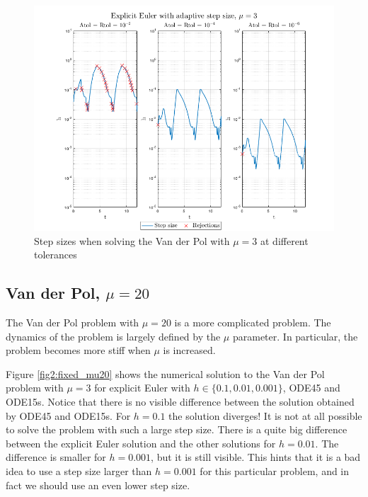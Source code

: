 \begin{figure}[H]
    \centering
    \includegraphics[width=\textwidth]{graphics/opg2/mu3_h.png}
    \caption{Step sizes when solving the Van der Pol with $\mu = 3$ at different tolerances}
    \label{fig2:adap_mu3_h}
\end{figure}

\subsection{Van der Pol, $\mu = 20$}
The Van der Pol problem with $\mu = 20$ is a more complicated problem. The dynamics of the problem is largely defined by the $\mu$ parameter. In particular, the problem becomes more stiff when $\mu$ is increased.

Figure \ref{fig2:fixed_mu20} shows the numerical solution to the Van der Pol problem with $\mu = 3$ for explicit Euler with $h \in \{0.1, 0.01, 0.001\}$, ODE45 and ODE15s. Notice that there is no visible difference between the solution obtained by ODE45 and ODE15s. For $h=0.1$ the solution diverges! It is not at all possible to solve the problem with such a large step size. There is a quite big difference between the explicit Euler solution and the other solutions for $h=0.01$. The difference is smaller for $h=0.001$, but it is still visible. This hints that it is a bad idea to use a step size larger than $h=0.001$ for this particular problem, and in fact we should use an even lower step size.

